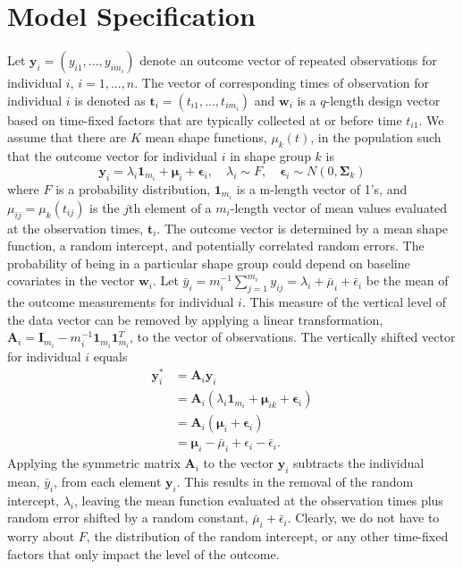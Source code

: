 \documentclass[12pt]{article}
\newcommand{\B}[0]{\mathbf}
\newcommand{\BS}[0]{\boldsymbol}
\begin{document}
\section{Model Specification}
 Let $\B y_{i}=(y_{i1},...,y_{im_{i}})$ denote an outcome vector of repeated observations for individual $i$, $i=1,...,n$. The vector of corresponding times of observation for individual $i$ is denoted as $\B t_{i}=(t_{i1},...,t_{im_{i}})$ and $\B w_{i}$ is a $q$-length design vector based on time-fixed factors that are typically collected at or before time $t_{i1}$. We assume that there are $K$ mean shape functions, $\mu_{k}(t)$, in the population such that the outcome vector for individual $i$ in shape group $k$ is
 $$\B y_{i} = \lambda_{i}\B 1_{m_{i}}+\BS\mu_{i}+\BS\epsilon_{i},\quad \lambda_{i}\sim F, \quad \BS\epsilon_{i}\sim N(0,\BS\Sigma_{k})$$
 where $F$ is a probability distribution, $\B 1_{m_{i}}$ is a m-length vector of 1's, and $\mu_{ij} = \mu_{k}(t_{ij})$ is the $j$th element of a $m_{i}$-length vector of mean values evaluated at the observation times, $\B t_{i}$. The outcome vector is determined by a mean shape function, a random intercept, and potentially correlated random errors. The probability of being in a particular shape group could depend on baseline covariates in the vector $\B w_{i}$. Let $\bar{y}_{i}= m_{i}^{-1}\sum^{m_{i}}_{j=1} y_{ij} = \lambda_{i}+\bar{\mu}_{i}+\bar{\epsilon}_{i}$ be the mean of the outcome measurements for individual $i$. This measure of the vertical level of the data vector can be removed by applying a linear transformation, $\B A_{i} = \B I_{m_{i}} - m_{i}^{-1}\B 1_{m_{i}}\B 1_{m_{i}}^{T}$, to the vector of observations. The vertically shifted vector for individual $i$ equals 
\begin{align*}
\B y^{*}_{i} &= \B A_{i}\B y_{i}\\
&=\B A_{i}(\lambda_{i}\B 1_{m_{i}}+\BS\mu_{ik}+\BS\epsilon_{i})\\
&=\B A_{i}(\BS\mu_{i}+\BS\epsilon_{i})\\
&=\BS\mu_{i} - \bar{\mu}_{i}+\epsilon_{i}-\bar{\epsilon}_{i}.
\end{align*}
Applying the symmetric matrix $\B A_{i}$ to the vector $\B y_{i}$ subtracts the individual mean, $\bar{y}_{i}$, from each element $\B y_{i}$. This results in the removal of the random intercept, $\lambda_{i}$, leaving the mean function evaluated at the observation times plus random error shifted by a random constant, $\bar{\mu}_{i}+\bar{\epsilon}_{i}$. Clearly, we do not have to worry about $F$, the distribution of the random intercept, or any other time-fixed factors that only impact the level of the outcome. 
\end{document}
